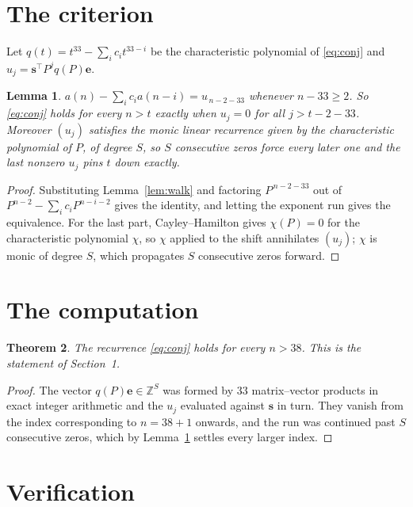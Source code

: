 \documentclass[11pt,a4paper]{article}
\theoremstyle{plain}
\newtheorem{theorem}{Theorem}
\newtheorem{lemma}[theorem]{Lemma}
\theoremstyle{definition}
\begin{document}
\section{The criterion}

Let $q(t)=t^{33}-\sum_i c_i t^{33-i}$ be the characteristic polynomial of
\eqref{eq:conj} and $u_j=\mathbf{s}^{\!\top}P^{j}q(P)\mathbf{e}$.

\begin{lemma}\label{lem:crit}
$a(n)-\sum_i c_i a(n-i)=u_{\,n-2-33}$ whenever $n-33\ge2$. So \eqref{eq:conj}
holds for every $n>t$ exactly when $u_j=0$ for all $j>t-2-33$. Moreover $(u_j)$
satisfies the monic linear recurrence given by the characteristic polynomial of $P$, of
degree $S$, so $S$ consecutive zeros force every later one and the last nonzero $u_j$ pins
$t$ down exactly.
\end{lemma}

\begin{proof}
Substituting Lemma~\ref{lem:walk} and factoring $P^{\,n-2-33}$ out of
$P^{n-2}-\sum_i c_i P^{n-i-2}$ gives the identity, and letting the exponent run gives the
equivalence. For the last part, Cayley--Hamilton gives $\chi(P)=0$ for the characteristic
polynomial $\chi$, so $\chi$ applied to the shift annihilates $(u_j)$; $\chi$ is monic of
degree $S$, which propagates $S$ consecutive zeros forward.
\end{proof}

\section{The computation}

\begin{theorem}
The recurrence \eqref{eq:conj} holds for every $n>38$. This is the statement of
Section~1.
\end{theorem}

\begin{proof}
The vector $q(P)\mathbf{e}\in\mathbb{Z}^{S}$ was formed by $33$ matrix--vector
products in exact integer arithmetic and the $u_j$ evaluated against $\mathbf{s}$ in turn.
They vanish from the index corresponding to $n=38+1$ onwards, and the run was continued
past $S$ consecutive zeros, which by Lemma~\ref{lem:crit} settles every larger index.
\end{proof}

\section{Verification}
\end{document}
